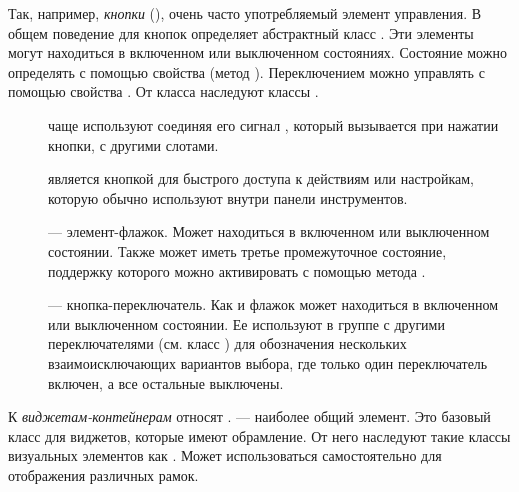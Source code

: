 Так, например, \emph{кнопки} (), очень часто употребляемый элемент управления. В общем поведение для кнопок
определяет абстрактный класс . Эти элементы могут находиться в включенном
или выключенном состояниях. Состояние можно определять с помощью свойства  (метод ). Переключением
можно управлять с помощью свойства  .
 От класса  
наследуют классы  .

\begin{description}
\item[] чаще используют соединяя его сигнал  , который вызывается
при нажатии кнопки, с другими слотами. 
\item[] является кнопкой для быстрого доступа к действиям или настройкам, которую обычно используют внутри панели инструментов.
\item[] --- элемент-флажок. Может находиться в включенном или выключенном
состоянии. Также может иметь третье промежуточное состояние, поддержку которого можно активировать с помощью метода
 .
\item[] --- кнопка-переключатель. Как и флажок может находиться в включенном или выключенном
состоянии. Ее используют в группе с другими переключателями (см. класс  ) для обозначения нескольких
взаимоисключающих вариантов выбора, где только один переключатель включен, а все остальные выключены. 
\end{description}

К \emph{виджетам-контейнерам}  относят  .  --- наиболее общий элемент. Это базовый класс для виджетов, которые имеют
обрамление. От него наследуют такие классы визуальных элементов как  . Может использоваться самостоятельно для отображения различных рамок.

